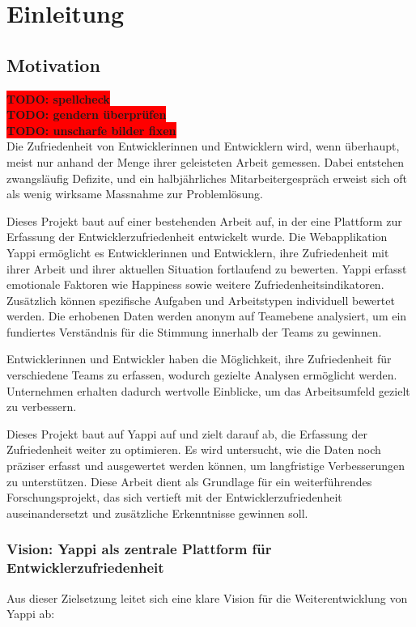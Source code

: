 \documentclass[12pt,a4paper]{report}
\newcommand{\todo}[1]{\colorbox{red}{\textbf{TODO: #1}}\\}
\begin{document}
\chapter{Einleitung}

\section{Motivation}
\todo{spellcheck}
\todo{gendern überprüfen}
\todo{unscharfe bilder fixen}

Die Zufriedenheit von Entwicklerinnen und Entwicklern wird, wenn überhaupt, meist nur anhand der Menge ihrer geleisteten Arbeit
gemessen. Dabei entstehen zwangsläufig Defizite, und ein halbjährliches Mitarbeitergespräch erweist sich oft als wenig wirksame
Massnahme zur Problemlösung.

Dieses Projekt baut auf einer bestehenden Arbeit auf, in der eine Plattform zur Erfassung der Entwicklerzufriedenheit entwickelt
wurde. Die Webapplikation Yappi ermöglicht es Entwicklerinnen und Entwicklern, ihre Zufriedenheit mit ihrer Arbeit und ihrer
aktuellen Situation fortlaufend zu bewerten. Yappi erfasst emotionale Faktoren wie Happiness sowie weitere 
Zufriedenheitsindikatoren. Zusätzlich können spezifische Aufgaben und Arbeitstypen individuell bewertet werden. Die erhobenen 
Daten werden anonym auf Teamebene analysiert, um ein fundiertes Verständnis für die Stimmung innerhalb der Teams zu gewinnen.

Entwicklerinnen und Entwickler haben die Möglichkeit, ihre Zufriedenheit für verschiedene Teams zu erfassen, wodurch gezielte
Analysen ermöglicht werden. Unternehmen erhalten dadurch wertvolle Einblicke, um das Arbeitsumfeld gezielt zu verbessern.

Dieses Projekt baut auf Yappi auf und zielt darauf ab, die Erfassung der Zufriedenheit weiter zu optimieren. Es wird untersucht,
wie die Daten noch präziser erfasst und ausgewertet werden können, um langfristige Verbesserungen zu unterstützen. Diese Arbeit
dient als Grundlage für ein weiterführendes Forschungsprojekt, das sich vertieft mit der Entwicklerzufriedenheit auseinandersetzt
und zusätzliche Erkenntnisse gewinnen soll.

\subsection{Vision: Yappi als zentrale Plattform für Entwicklerzufriedenheit}

Aus dieser Zielsetzung leitet sich eine klare Vision für die Weiterentwicklung von Yappi ab:
\end{document}
